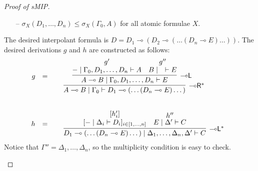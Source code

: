 \documentclass[sn-mathphys-num]{sn-jnl}%
\newcommand{\GG}{\Gamma}
\newcommand{\GD}{\Delta}
\newcommand{\vd}{\vdash}
\newcommand{\lolli}{\multimap}
\newcommand{\lleft}{{\lolli}\mathsf{L}}
\newcommand{\lright}{{\lolli}\mathsf{R}}
\newcommand{\proofbox}[1]{\begin{tabular}{l} #1 \end{tabular}}
\newcommand{\gs}[1]{\sigma_{X} (#1)}
\newcommand{\sMIP}{\textsf{sMIP}}
\theoremstyle{thmstyleone}%
\theoremstyle{thmstyletwo}%
\theoremstyle{thmstylethree}%
\begin{document}
\begin{proof}[Proof of \sMIP]
\begin{itemize}
\begin{itemize}
\item[--] $\gs{D_1 , \dots , D_n} \leq \gs{\GG_0 , A}$ for all atomic formulae $X$.
\end{itemize}
The desired interpolant formula is $D = D_1 \lolli (D_2 \lolli (\dots (D_n \lolli E)\dots))$.
The desired derivations $g$ and $h$ are constructed as follows:
\begin{displaymath}
\begin{array}{rcl}
  g 
  &=&
  \proofbox{
      \infer[\lright^*]{A\lolli B \mid \GG_0 \vd D_1 \lolli (\dots (D_n \lolli E)\dots)}{
        \infer[\lleft]{A \lolli B \mid \GG_0 , D_1, \dots, D_n \vd E}{
          \deduce{{-} \mid \GG_0 , D_1, \dots, D_n \vd A}{g'}
          &
          \deduce{B \mid \quad \vd E}{g''}
      }
    }
}
    \\[1.5cm]
  h
    &=&
    \proofbox{
      \infer[\lleft^*]{D_1 \lolli (\dots (D_n \lolli E)\dots) \mid \GD_1, \dots, \GD_n, \GD' \vd C}{
      \deduce{[{-} \mid \GD_i \vd D_i]_{i \in [1, \dots,n]}}{[h'_i]}
      &
            \deduce{E \mid \GD' \vd C}{h''}
    }
    }
  \end{array}
\end{displaymath}
Notice that $\GG'' = \GD_1, \dots, \GD_n$, so the multiplicity condition is easy to check.
\end{itemize}
\end{proof}
\end{document}

